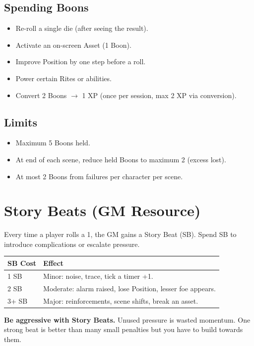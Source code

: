 \documentclass[11pt]{book}
\begin{document}
\subsection*{Spending Boons}
\begin{itemize}
  \item Re-roll a single die (after seeing the result).
  \item Activate an on-screen Asset (1 Boon).
  \item Improve Position by one step before a roll.
  \item Power certain Rites or abilities.
  \item Convert 2 Boons $\rightarrow$ 1 XP (once per session, max 2 XP via conversion).
\end{itemize}

\subsection*{Limits}
\begin{itemize}
  \item Maximum 5 Boons held.
  \item At end of each scene, reduce held Boons to maximum 2 (excess lost).
  \item At most 2 Boons from failures per character per scene.
\end{itemize}

\section{Story Beats (GM Resource)}

Every time a player rolls a 1, the GM gains a Story Beat (SB). Spend SB to introduce complications or escalate pressure.

\begin{center}
\begin{tabular}{ll}
\toprule
\textbf{SB Cost} & \textbf{Effect} \\
\midrule
1 SB & Minor: noise, trace, tick a timer +1. \\
2 SB & Moderate: alarm raised, lose Position, lesser foe appears. \\
3+ SB & Major: reinforcements, scene shifts, break an asset. \\
\bottomrule
\end{tabular}
\end{center}

\begin{tipbox}
\textbf{Be aggressive with Story Beats.} Unused pressure is wasted momentum. One strong beat is better than many small penalties but you have to build towards them.
\end{tipbox}
\end{document}
